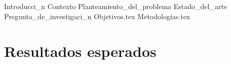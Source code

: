 \documentclass{article}
\begin{document}
  \begin{titlepage}
    \centering
    \vspace*{2cm}
    \titleblock [2cm]
    \vspace{1cm}  %
    \vfill  %
    \location \\
    \dateblock \\
    \footnotesize { \texttt{\fullversion} }
  \end{titlepage}

  
  \newcommand{\ab}[1]{{\color{red}\textbf{AB: #1}}}
  
  \attributionpage

  \tableofcontents
  \newpage

  \clearpage

  {Introducci_n}
  {Contexto}
  {Planteamiento_del_problema}
  {Estado_del_arte}
  {Pregunta_de_investigaci_n}
  {Objetivos.tex}
  {Metodologias.tex}
  
  \section{Resultados esperados}
    \blindtext

  \printbibliography
\end{document}
